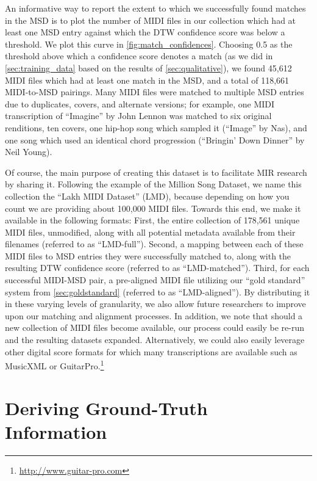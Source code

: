 An informative way to report the extent to which we successfully found matches in the MSD is to plot the number of MIDI files in our collection which had at least one MSD entry against which the DTW confidence score was below a threshold.
We plot this curve in \cref{fig:match_confidences}.
Choosing 0.5 as the threshold above which a confidence score denotes a match (as we did in \cref{sec:training_data} based on the results of \cref{sec:qualitative}), we found 45,612 MIDI files which had at least one match in the MSD, and a total of 118,661 MIDI-to-MSD pairings.
Many MIDI files were matched to multiple MSD entries due to duplicates, covers, and alternate versions; for example, one MIDI transcription of ``Imagine'' by John Lennon was matched to six original renditions, ten covers, one hip-hop song which sampled it (``Image'' by Nas), and one song which used an identical chord progression (``Bringin' Down Dinner'' by Neil Young).


Of course, the main purpose of creating this dataset is to facilitate MIR research by sharing it.
Following the example of the Million Song Dataset, we name this collection the ``Lakh MIDI Dataset'' (LMD), because depending on how you count we are providing about 100,000 MIDI files.
Towards this end, we make it available in the following formats:
First, the entire collection of 178,561 unique MIDI files, unmodified, along with all potential metadata available from their filenames (referred to as ``LMD-full'').
Second, a mapping between each of these MIDI files to MSD entries they were successfully matched to, along with the resulting DTW confidence score (referred to as ``LMD-matched'').
Third, for each successful MIDI-MSD pair, a pre-aligned MIDI file utilizing our ``gold standard'' system from \cref{sec:goldstandard} (referred to as ``LMD-aligned'').
By distributing it in these varying levels of granularity, we also allow future researchers to improve upon our matching and alignment processes.
In addition, we note that should a new collection of MIDI files become available, our process could easily be re-run and the resulting datasets expanded.
Alternatively, we could also easily leverage other digital score formats for which many transcriptions are available such as MusicXML \cite{good2001musicxml} or GuitarPro.\footnote{\url{http://www.guitar-pro.com}}

\section{Deriving Ground-Truth Information}
\label{sec:deriving}

